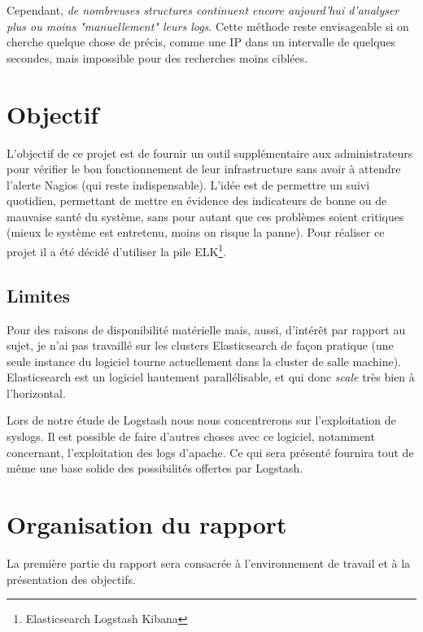 \documentclass[a4paper,12pt,one side,titlepage]{report}
\begin{document}
Cependant, \emph{de nombreuses structures continuent encore aujourd'hui d'analyser 
plus ou moins "manuellement" leurs \emph{\gls{logs}}}. Cette méthode reste envisageable 
si on cherche quelque chose de précis, comme une IP dans un intervalle de quelques 
secondes, mais impossible pour des recherches moins ciblées.


\section{Objectif}
L'objectif de ce projet est de fournir un outil supplémentaire aux administrateurs
pour vérifier le bon fonctionnement de leur infrastructure sans avoir à attendre l'alerte
Nagios (qui reste indispensable). L'idée est de permettre un suivi quotidien, permettant
de mettre en évidence des indicateurs de bonne ou de mauvaise santé du système, sans 
pour autant que ces problèmes soient critiques (mieux le système est entretenu, moins
on risque la panne).
Pour réaliser ce projet il a été décidé d'utiliser la pile ELK\footnote{Elasticsearch Logstash Kibana}.



\subsection{Limites}
Pour des raisons de disponibilité matérielle mais, aussi, d'intérêt par rapport au sujet,
je n'ai pas travaillé sur les clusters Elasticsearch de façon pratique (une seule 
instance du logiciel tourne actuellement dans la cluster de salle machine). Elasticsearch
est un logiciel hautement parallélisable, et qui donc \textit{scale} très bien à 
l'horizontal. 


Lors de notre étude de Logstash nous nous concentrerons sur l'exploitation de syslogs. 
Il est possible de faire d'autres choses avec ce logiciel, notamment concernant, 
l'exploitation des logs d'apache. 
Ce qui sera présenté fournira tout de même une base solide des possibilités offertes
par Logstash.


\section{Organisation du rapport}
La première partie du rapport sera consacrée à l'environnement de travail et à la 
présentation des objectifs. 
\end{document}
